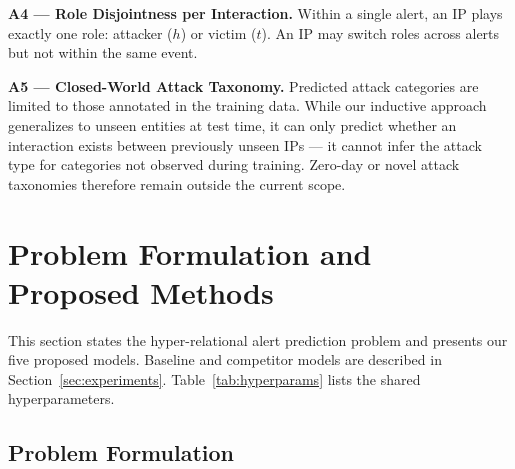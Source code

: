 \documentclass[10pt,journal,compsoc]{IEEEtran}
\begin{document}
\textbf{A4 --- Role Disjointness per Interaction.}
Within a single alert, an IP plays exactly one role:
attacker ($h$) or victim ($t$). An IP may switch roles
across alerts but not within the same event.

\textbf{A5 --- Closed-World Attack Taxonomy.}
Predicted attack categories are limited to those annotated
in the training data. While our inductive approach
generalizes to unseen entities at test time, it can only
predict whether an interaction exists between previously
unseen IPs --- it cannot infer the attack type for
categories not observed during training. Zero-day or
novel attack taxonomies therefore remain outside the
current scope.




\iffalse
\section{Problem Formulation and Proposed Methods}
\label{sec:models}

This section states the hyper-relational alert prediction
problem and presents our five proposed models.
Baseline and competitor models are described in
Section~\ref{sec:experiments}.
Table~\ref{tab:hyperparams} lists the shared hyperparameters.


\subsection{Problem Formulation}
\label{ssec:problem}
\end{document}
